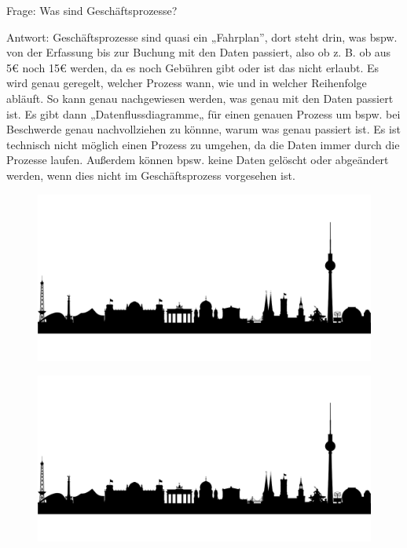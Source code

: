 \bigbreak
\bigbreak

Frage:
Was sind Geschäftsprozesse?

\bigbreak

Antwort:
Geschäftsprozesse sind quasi ein „Fahrplan”, dort steht drin, was bspw. von der Erfassung bis zur Buchung mit den Daten passiert, also ob z. B. ob aus 5€ noch 15€ werden, da es noch Gebühren gibt oder ist das nicht erlaubt.
Es wird genau geregelt, welcher Prozess wann, wie und in welcher Reihenfolge abläuft.
So kann genau nachgewiesen werden, was genau mit den Daten passiert ist.
Es gibt dann „Datenflussdiagramme„ für einen genauen Prozess um bspw. bei Beschwerde genau nachvollziehen zu könnne, warum was genau passiert ist.
Es ist technisch nicht möglich einen Prozess zu umgehen, da die Daten immer durch die Prozesse laufen.
Außerdem können bpsw. keine Daten gelöscht oder abgeändert werden, wenn dies nicht im Geschäftsprozess vorgesehen ist.

\newpage

\begin{figure}[ht]
    \centering\includegraphics[width=1.0\textwidth]{Abbildungen/Template.png}
\end{figure}

\begin{figure}[ht]
    \centering\includegraphics[width=1.0\textwidth]{Abbildungen/Template.png}
\end{figure}

\newpage

\bigbreak